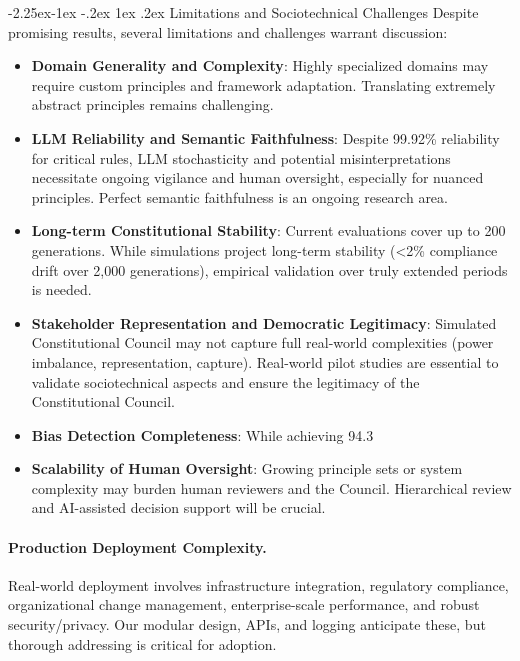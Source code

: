 \documentclass[manuscript,screen,review,anonymous,9pt]{acmart}
\makeatletter
\renewcommand\subsection{\@startsection{subsection}{2}{\z@}%
  {-2.25ex\@plus -1ex \@minus -.2ex}%
  {1ex \@plus .2ex}%
  {\normalfont\large\bfseries}}
\makeatother
\begin{document}
\subsection{Limitations and Sociotechnical Challenges}
\label{subsec:challenges_limitations_merged} 
Despite promising results, several limitations and challenges warrant discussion:
\begin{itemize}[leftmargin=*,itemsep=1pt,parsep=1pt]
    \item \textbf{Domain Generality and Complexity}: Highly specialized domains may require custom principles and framework adaptation. Translating extremely abstract principles remains challenging.
    \item \textbf{LLM Reliability and Semantic Faithfulness}: Despite 99.92\% reliability for critical rules, LLM stochasticity and potential misinterpretations necessitate ongoing vigilance and human oversight, especially for nuanced principles. Perfect semantic faithfulness is an ongoing research area.
    \item \textbf{Long-term Constitutional Stability}: Current evaluations cover up to 200 generations. While simulations project long-term stability (<2\% compliance drift over 2,000 generations), empirical validation over truly extended periods is needed.
    \item \textbf{Stakeholder Representation and Democratic Legitimacy}: Simulated Constitutional Council may not capture full real-world complexities (power imbalance, representation, capture). Real-world pilot studies are essential to validate sociotechnical aspects and ensure the legitimacy of the Constitutional Council.
    \item \textbf{Bias Detection Completeness}: While achieving 94.3%
    \item \textbf{Scalability of Human Oversight}: Growing principle sets or system complexity may burden human reviewers and the Council. Hierarchical review and AI-assisted decision support will be crucial.
\end{itemize}

\paragraph{Production Deployment Complexity.} Real-world deployment involves infrastructure integration, regulatory compliance, organizational change management, enterprise-scale performance, and robust security/privacy. Our modular design, APIs, and logging anticipate these, but thorough addressing is critical for adoption.
\end{document}

